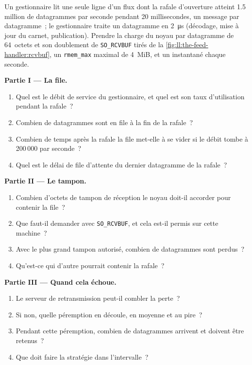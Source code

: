 \begin{problem}\label{pb:ll:the-feed-handler:1}
Un gestionnaire lit une seule ligne d'un flux dont la rafale d'ouverture atteint 1.5 million de datagrammes par seconde pendant 20 millisecondes, un
message par datagramme~; le gestionnaire traite un datagramme en \qty{2}{\micro\second} (décodage, mise à jour du carnet, publication). Prendre la
charge du noyau par datagramme de 64~octets et son doublement de \texttt{SO\_RCVBUF} tirés de la \cref{fig:ll:the-feed-handler:rcvbuf}, un
\texttt{rmem\_max} maximal de 4~MiB, et un instantané chaque seconde.

\medskip\noindent\textbf{Partie I --- La file.}
\begin{enumerate}
\item Quel est le débit de service du gestionnaire, et quel est son taux d'utilisation pendant la rafale~?
\item Combien de datagrammes sont en file à la fin de la rafale~?
\item Combien de temps après la rafale la file met-elle à se vider si le débit tombe à 200\,000 par seconde~?
\item Quel est le délai de file d'attente du dernier datagramme de la rafale~?
\end{enumerate}

\medskip\noindent\textbf{Partie II --- Le tampon.}
\begin{enumerate}[resume]
\item Combien d'octets de tampon de réception le noyau doit-il accorder pour contenir la file~?
\item Que faut-il demander avec \texttt{SO\_RCVBUF}, et cela est-il permis sur cette machine~?
\item Avec le plus grand tampon autorisé, combien de datagrammes sont perdus~?
\item Qu'est-ce qui d'autre pourrait contenir la rafale~?
\end{enumerate}

\medskip\noindent\textbf{Partie III --- Quand cela échoue.}
\begin{enumerate}[resume]
\item Le serveur de retransmission peut-il combler la perte~?
\item Si non, quelle péremption en découle, en moyenne et au pire~?
\item Pendant cette péremption, combien de datagrammes arrivent et doivent être retenus~?
\item Que doit faire la stratégie dans l'intervalle~?
\end{enumerate}


\end{problem}
